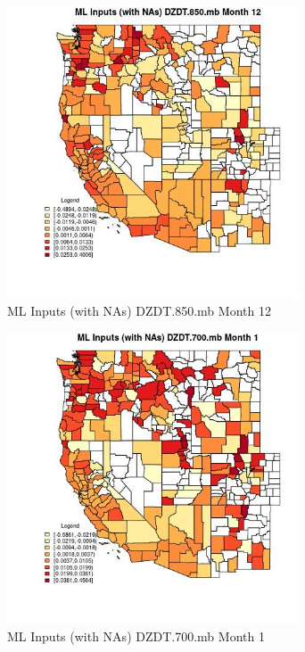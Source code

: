 \begin{figure} 
\centering  
\includegraphics[width=0.77\textwidth]{Code_Outputs/Report_ML_input_PM25_Step4_part_f_de_duplicated_aves_prioritize_24hr_obswNAs_CountyDZDT850mbmedianMonth12.jpg} 
\caption{\label{fig:Report_ML_input_PM25_Step4_part_f_de_duplicated_aves_prioritize_24hr_obswNAsCountyDZDT850mbmedianMonth12}ML Inputs (with NAs) DZDT.850.mb Month 12} 
\end{figure} 
 

\begin{figure} 
\centering  
\includegraphics[width=0.77\textwidth]{Code_Outputs/Report_ML_input_PM25_Step4_part_f_de_duplicated_aves_prioritize_24hr_obswNAs_CountyDZDT700mbmedianMonth1.jpg} 
\caption{\label{fig:Report_ML_input_PM25_Step4_part_f_de_duplicated_aves_prioritize_24hr_obswNAsCountyDZDT700mbmedianMonth1}ML Inputs (with NAs) DZDT.700.mb Month 1} 
\end{figure} 
 

